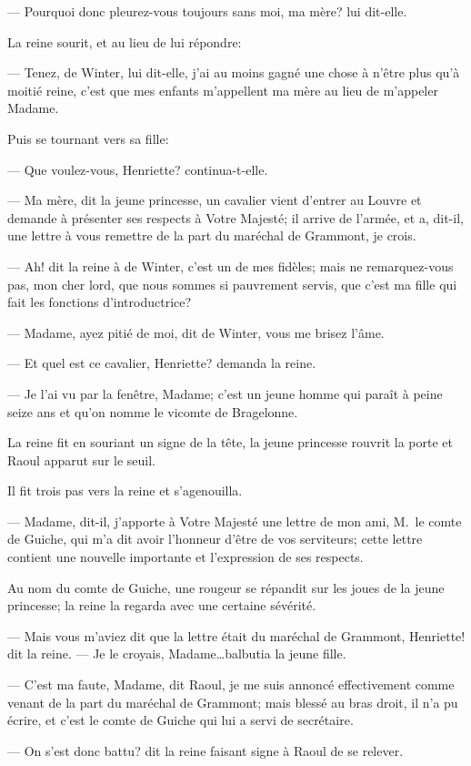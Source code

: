 — Pourquoi donc pleurez-vous toujours sans moi, ma mère? lui dit-elle.

La reine sourit, et au lieu de lui répondre:

— Tenez, de Winter, lui dit-elle, j'ai au moins gagné une chose à n'être plus qu'à moitié reine, c'est que mes enfants m'appellent ma mère au lieu de m'appeler Madame.

Puis se tournant vers sa fille:

— Que voulez-vous, Henriette? continua-t-elle.

— Ma mère, dit la jeune princesse, un cavalier vient d'entrer au Louvre et demande à présenter ses respects à Votre Majesté; il arrive de l'armée, et a, dit-il, une lettre à vous remettre de la part du maréchal de Grammont, je crois.

— Ah! dit la reine à de Winter, c'est un de mes fidèles; mais ne remarquez-vous pas, mon cher lord, que nous sommes si pauvrement servis, que c'est ma fille qui fait les fonctions d'introductrice?

— Madame, ayez pitié de moi, dit de Winter, vous me brisez l'âme.

— Et quel est ce cavalier, Henriette? demanda la reine.

— Je l'ai vu par la fenêtre, Madame; c'est un jeune homme qui paraît à peine seize ans et qu'on nomme le vicomte de Bragelonne.

La reine fit en souriant un signe de la tête, la jeune princesse rouvrit la porte et Raoul apparut sur le seuil.

Il fit trois pas vers la reine et s'agenouilla.

— Madame, dit-il, j'apporte à Votre Majesté une lettre de mon ami, M.~le comte de Guiche, qui m'a dit avoir l'honneur d'être de vos serviteurs; cette lettre contient une nouvelle importante et l'expression de ses respects.

Au nom du comte de Guiche, une rougeur se répandit sur les joues de la jeune princesse; la reine la regarda avec une certaine sévérité.

— Mais vous m'aviez dit que la lettre était du maréchal de Grammont, Henriette! dit la reine.
— Je le croyais, Madame\dots balbutia la jeune fille.

— C'est ma faute, Madame, dit Raoul, je me suis annoncé effectivement comme venant de la part du maréchal de Grammont; mais blessé au bras droit, il n'a pu écrire, et c'est le comte de Guiche qui lui a servi de secrétaire.

— On s'est donc battu? dit la reine faisant signe à Raoul de se relever.

